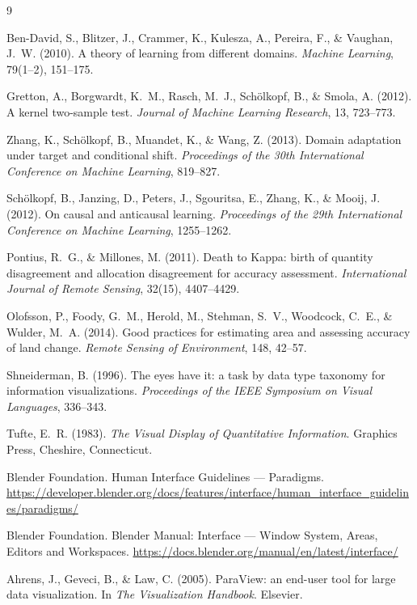 \documentclass[11pt,a4paper]{article}
\begin{document}
\begin{thebibliography}{9}
\small

Ben-David, S., Blitzer, J., Crammer, K., Kulesza, A., Pereira, F., \& Vaughan,
J.~W. (2010). A theory of learning from different domains.
\emph{Machine Learning}, 79(1--2), 151--175.

Gretton, A., Borgwardt, K.~M., Rasch, M.~J., Sch\"olkopf, B., \& Smola, A.
(2012). A kernel two-sample test. \emph{Journal of Machine Learning Research},
13, 723--773.

Zhang, K., Sch\"olkopf, B., Muandet, K., \& Wang, Z. (2013). Domain adaptation
under target and conditional shift. \emph{Proceedings of the 30th International
Conference on Machine Learning}, 819--827.

Sch\"olkopf, B., Janzing, D., Peters, J., Sgouritsa, E., Zhang, K., \& Mooij, J.
(2012). On causal and anticausal learning. \emph{Proceedings of the 29th
International Conference on Machine Learning}, 1255--1262.

Pontius, R.~G., \& Millones, M. (2011). Death to Kappa: birth of quantity
disagreement and allocation disagreement for accuracy assessment.
\emph{International Journal of Remote Sensing}, 32(15), 4407--4429.

Olofsson, P., Foody, G.~M., Herold, M., Stehman, S.~V., Woodcock, C.~E., \&
Wulder, M.~A. (2014). Good practices for estimating area and assessing accuracy
of land change. \emph{Remote Sensing of Environment}, 148, 42--57.

Shneiderman, B. (1996). The eyes have it: a task by data type taxonomy for
information visualizations. \emph{Proceedings of the IEEE Symposium on Visual
Languages}, 336--343.

Tufte, E.~R. (1983). \emph{The Visual Display of Quantitative Information}.
Graphics Press, Cheshire, Connecticut.

Blender Foundation. Human Interface Guidelines --- Paradigms.
\url{https://developer.blender.org/docs/features/interface/human_interface_guidelines/paradigms/}

Blender Foundation. Blender Manual: Interface --- Window System, Areas, Editors
and Workspaces. \url{https://docs.blender.org/manual/en/latest/interface/}

Ahrens, J., Geveci, B., \& Law, C. (2005). ParaView: an end-user tool for large
data visualization. In \emph{The Visualization Handbook}. Elsevier.


\end{thebibliography}
\end{document}
